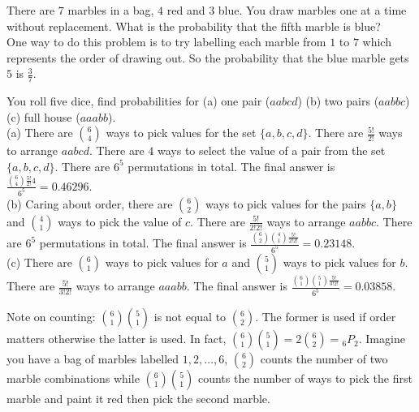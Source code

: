 \begin{texample}
	There are $7$ marbles in a bag, $4$ red and $3$ blue. You draw marbles one at a time without replacement. What is the probability that the fifth marble is blue? \\
	
	One way to do this problem is to try labelling each marble from $1$ to $7$ which represents the order of drawing out. So the probability that the blue marble gets $5$ is $\frac37$.
\end{texample}

\begin{texample}
	You roll five dice, find probabilities for (a) one pair ($aabcd$) (b) two pairs ($aabbc$) (c) full house ($aaabb$). \\
	
	(a) There are $\binom{6}{4}$ ways to pick values for the set $\{a, b, c, d\}$. There are $\frac{5!}{2!}$ ways to arrange $aabcd$. There are $4$ ways to select the value of a pair from the set $\{a, b, c, d\}$. There are $6^5$ permutations in total. The final answer is $\frac{\binom{6}{4}\frac{5!}{2!}4}{6^5}=0.46296$. \\
	
	(b) Caring about order, there are $\binom{6}{2}$ ways to pick values for the pairs $\{a, b\}$ and $\binom{4}{1}$ ways to pick the value of $c$. There are $\frac{5!}{2!2!}$ ways to arrange $aabbc$. There are $6^5$ permutations in total. The final answer is $\frac{\binom{6}{2}\binom{4}{1}\frac{5!}{2!2!}}{6^5}=0.23148$. \\
	
	(c) There are $\binom{6}{1}$ ways to pick values for $a$ and $\binom{5}{1}$ ways to pick values for $b$. There are $\frac{5!}{3!2!}$ ways to arrange $aaabb$. The final answer is $\frac{\binom{6}{1}\binom{5}{1}\frac{5!}{3!2!}}{6^5}=0.03858$.
\end{texample}

Note on counting: $\binom{6}{1}\binom{5}{1}$ is not equal to $\binom{6}{2}$. The former is used if order matters otherwise the latter is used. In fact, $\binom{6}{1}\binom{5}{1}=2\binom{6}{2}={}_6P_2$. Imagine you have a bag of marbles labelled $1, 2, \dots, 6$, $\binom{6}{2}$ counts the number of two marble combinations while $\binom{6}{1}\binom{5}{1}$ counts the number of ways to pick the first marble and paint it red then pick the second marble.

